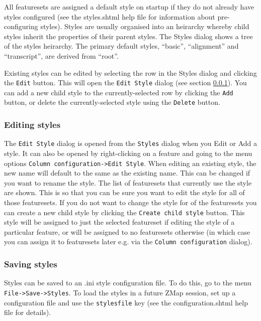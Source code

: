 \documentclass[letterpaper]{article}
\begin{document}
All featuresets are assigned a default style on startup if they do not already have styles configured (see the styles.shtml help file for information about pre-configuring styles). Styles are usually organised into an heirarchy whereby child styles inherit the properties of their parent styles. The Styles dialog shows a tree of the styles heirarchy. The primary default styles, ``basic'', ``alignment'' and ``transcript'', are derived from ``root''. 

Existing styles can be edited by selecting the row in the Styles dialog and clicking the \lstinline{Edit} button. This will open the \lstinline{Edit Style} dialog (see section \ref{sec_edit_style}). You can add a new child style to the currently-selected row by clicking the \lstinline{Add} button, or delete the currently-selected style using the \lstinline{Delete} button.

\subsubsection{Editing styles} \label{sec_edit_style}
The \lstinline{Edit Style} dialog is opened from the \lstinline{Styles} dialog when you Edit or Add a style. It can also be opened by right-clicking on a feature and going to the menu options \lstinline{Column configuration->Edit Style}. When editing an existing style, the new name will default to the same as the existing name. This can be changed if you want to rename the style. The list of featuresets that currently use the style are shown. This is so that you can be sure you want to edit the style for all of those featuresets. If you do not want to change the style for of the featuresets you can create a new child style by clicking the \lstinline{Create child style} button. This style will be assigned to just the selected featureset if editing the style of a particular feature, or will be assigned to no featuresets otherwise (in which case you can assign it to featuresets later e.g. via the \lstinline{Column configuration} dialog).

\subsubsection{Saving styles}
Styles can be saved to an .ini style configuration file. To do this, go to the menu \lstinline{File->Save->Styles}. To load the styles in a future ZMap session, set up a configuration file and use the \lstinline{stylesfile} key (see the configuration.shtml help file for details).
\end{document}
